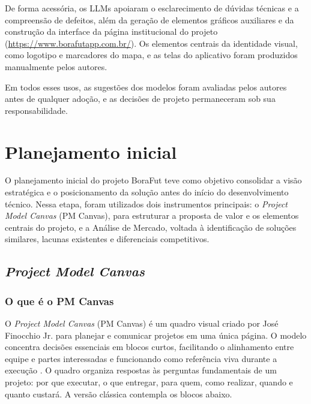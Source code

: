         De forma acessória, os LLMs apoiaram o esclarecimento de dúvidas técnicas e a compreensão de defeitos, além da geração de elementos gráficos auxiliares e da construção da interface da página institucional do projeto (\url{https://www.borafutapp.com.br/}). Os elementos centrais da identidade visual, como logotipo e marcadores do mapa, e as telas do aplicativo foram produzidos manualmente pelos autores.

        Em todos esses usos, as sugestões dos modelos foram avaliadas pelos autores antes de qualquer adoção, e as decisões de projeto permaneceram sob sua responsabilidade.

\section{Planejamento inicial}

    O planejamento inicial do projeto BoraFut teve como objetivo consolidar a visão estratégica e o posicionamento da solução antes do início do desenvolvimento técnico. Nessa etapa, foram utilizados dois instrumentos principais: o \textit{Project Model Canvas} (PM Canvas), para estruturar a proposta de valor e os elementos centrais do projeto, e a Análise de Mercado, voltada à identificação de soluções similares, lacunas existentes e diferenciais competitivos.

    \subsection{\textit{Project Model Canvas}}
        \subsubsection*{O que é o PM Canvas}
        O \textit{Project Model Canvas} (PM Canvas) é um quadro visual criado por José Finocchio Jr. para planejar e comunicar projetos em uma única página. O modelo concentra decisões essenciais em blocos curtos, facilitando o alinhamento entre equipe e partes interessadas e funcionando como referência viva durante a execução \cite{pmcanvas}. O quadro organiza respostas às perguntas fundamentais de um projeto: por que executar, o que entregar, para quem, como realizar, quando e quanto custará. A versão clássica contempla os blocos abaixo.

